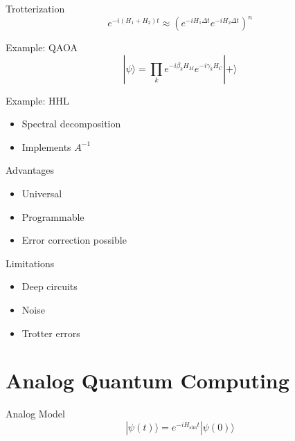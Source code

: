 \documentclass{beamer}
\begin{document}

\begin{frame}{Trotterization}
\[
e^{-i(H_1+H_2)t} \approx
\left(e^{-iH_1\Delta t}e^{-iH_2\Delta t}\right)^n
\]
\end{frame}


\begin{frame}{Example: QAOA}
\[
|\psi\rangle =
\prod_k e^{-i\beta_k H_M} e^{-i\gamma_k H_C}|+\rangle
\]
\end{frame}


\begin{frame}{Example: HHL}
\begin{itemize}
\item Spectral decomposition
\item Implements $A^{-1}$
\end{itemize}
\end{frame}


\begin{frame}{Advantages}
\begin{itemize}
\item Universal
\item Programmable
\item Error correction possible
\end{itemize}
\end{frame}


\begin{frame}{Limitations}
\begin{itemize}
\item Deep circuits
\item Noise
\item Trotter errors
\end{itemize}
\end{frame}

\section{Analog Quantum Computing}

\begin{frame}{Analog Model}
\[
|\psi(t)\rangle = e^{-iH_{\text{sim}}t}|\psi(0)\rangle
\]
\end{frame}
\end{document}

